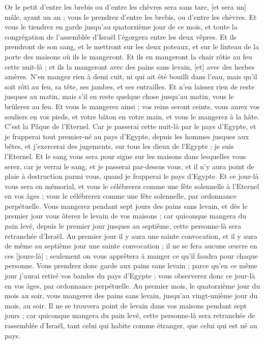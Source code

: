 \begin{multicols}{2}
Or le petit d'entre les brebis ou d'entre les chèvres sera sans tare, [et sera un] mâle, ayant un an ; vous le prendrez d'entre les brebis, ou d'entre les chèvres.
Et vous le tiendrez en garde jusqu'au quatorzième jour de ce mois, et toute la congrégation de l'assemblée d'Israël l'égorgera entre les deux vêpres.
Et ils prendront de son sang, et le mettront sur les deux poteaux, et sur le linteau de la porte des maisons où ils le mangeront.
Et ils en mangeront la chair rôtie au feu cette nuit-là ; et ils la mangeront avec des pains sans levain, [et] avec des herbes amères.
N'en mangez rien à demi cuit, ni qui ait été bouilli dans l'eau, mais qu'il soit rôti au feu, sa tête, ses jambes, et ses entrailles.
Et n'en laissez rien de reste jusques au matin, mais s'il en reste quelque chose jusqu'au matin, vous le brûlerez au feu.
Et vous le mangerez ainsi ; vos reins seront ceints, vous aurez vos souliers en vos pieds, et votre bâton en votre main, et vous le mangerez à la hâte. C'est la Pâque de l'Eternel.
Car je passerai cette nuit-là par le pays d'Egypte, et je frapperai tout premier-né au pays d'Egypte, depuis les hommes jusques aux bêtes, et j'exercerai des jugements, sur tous les dieux de l'Egypte ; je suis l'Eternel.
Et le sang vous sera pour signe sur les maisons dans lesquelles vous serez, car je verrai le sang, et je passerai par-dessus vous, et il n'y aura point de plaie à destruction parmi vous, quand je frapperai le pays d'Egypte.
Et ce jour-là vous sera en mémorial, et vous le célébrerez comme une fête solennelle à l'Eternel en vos âges ; vous le célébrerez comme une fête solennelle, par ordonnance perpétuelle.
Vous mangerez pendant sept jours des pains sans levain, et dès le premier jour vous ôterez le levain de vos maisons ; car quiconque mangera du pain levé, depuis le premier jour jusques au septième, cette personne-là sera retranchée d'Israël.
Au premier jour il y aura une sainte convocation, et il y aura de même au septième jour une sainte convocation ; il ne se fera aucune œuvre en ces [jours-là] ; seulement on vous apprêtera à manger ce qu'il faudra pour chaque personne.
Vous prendrez donc garde aux pains sans levain ; parce qu'en ce même jour j'aurai retiré vos bandes du pays d'Egypte ; vous observerez donc ce jour-là en vos âges, par ordonnance perpétuelle.
Au premier mois, le quatorzième jour du mois au soir, vous mangerez des pains sans levain, jusqu'au vingt-unième jour du mois, au soir.
Il ne se trouvera point de levain dans vos maisons pendant sept jours ; car quiconque mangera du pain levé, cette personne-là sera retranchée de rassemblée d'Israël, tant celui qui habite comme étranger, que celui qui est né au pays.

\end{multicols}
